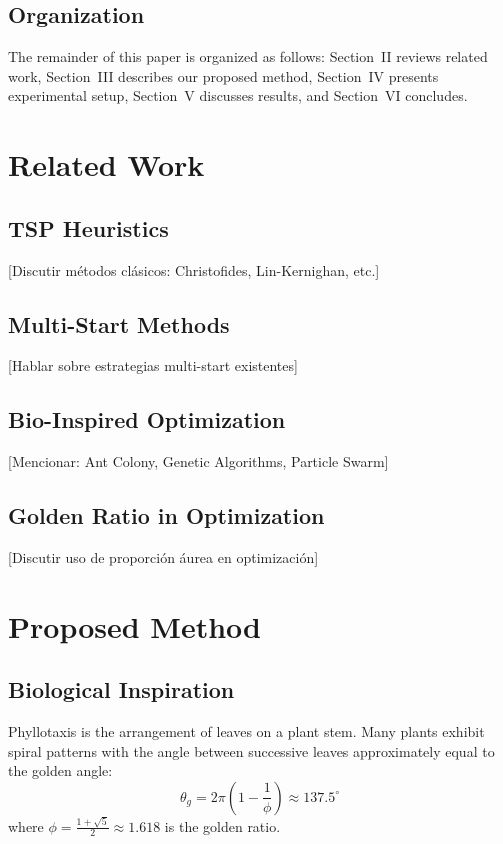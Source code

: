 \documentclass[conference]{IEEEtran}
\begin{document}
\subsection{Organization}
The remainder of this paper is organized as follows: Section~II reviews related work, Section~III describes our proposed method, Section~IV presents experimental setup, Section~V discusses results, and Section~VI concludes.

\section{Related Work}

\subsection{TSP Heuristics}
[Discutir métodos clásicos: Christofides, Lin-Kernighan, etc.]

\subsection{Multi-Start Methods}
[Hablar sobre estrategias multi-start existentes]

\subsection{Bio-Inspired Optimization}
[Mencionar: Ant Colony, Genetic Algorithms, Particle Swarm]

\subsection{Golden Ratio in Optimization}
[Discutir uso de proporción áurea en optimización]

\section{Proposed Method}

\subsection{Biological Inspiration}
Phyllotaxis is the arrangement of leaves on a plant stem. Many plants exhibit spiral patterns with the angle between successive leaves approximately equal to the golden angle:
\begin{equation}
\theta_g = 2\pi\left(1 - \frac{1}{\phi}\right) \approx 137.5^{\circ}
\end{equation}
where $\phi = \frac{1+\sqrt{5}}{2} \approx 1.618$ is the golden ratio.
\end{document}
